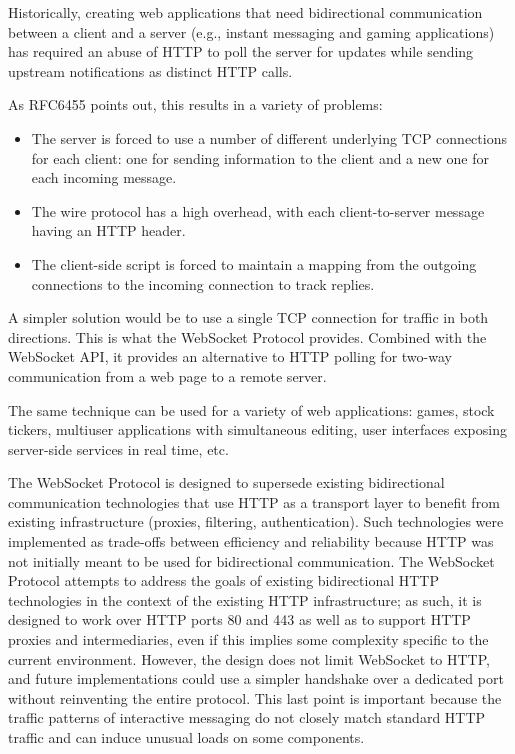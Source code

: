 Historically, creating web applications that need bidirectional communication
between a client and a server (e.g., instant messaging and gaming applications)
has required an abuse of HTTP to poll the server for updates while sending
upstream notifications as distinct HTTP calls.

As RFC6455\cite{websockets} points out, this results in a variety of problems:

\begin{itemize}

\item The server is forced to use a number of different underlying TCP
  connections for each client: one for sending information to the
  client and a new one for each incoming message.

\item The wire protocol has a high overhead, with each client-to-server
  message having an HTTP header.

\item The client-side script is forced to maintain a mapping from the
  outgoing connections to the incoming connection to track replies.

\end{itemize}

A simpler solution would be to use a single TCP connection for traffic in both
directions. This is what the WebSocket Protocol provides. Combined with the
WebSocket API, it provides an alternative to HTTP polling for two-way
communication from a web page to a remote server.

The same technique can be used for a variety of web applications: games, stock
tickers, multiuser applications with simultaneous editing, user interfaces
exposing server-side services in real time, etc.

The WebSocket Protocol is designed to supersede existing bidirectional
communication technologies that use HTTP as a transport layer to benefit from
existing infrastructure (proxies, filtering, authentication). Such technologies
were implemented as trade-offs between efficiency and reliability because HTTP
was not initially meant to be used for bidirectional communication. The
WebSocket Protocol attempts to address the goals of existing bidirectional HTTP
technologies in the context of the existing HTTP infrastructure; as such, it is
designed to work over HTTP ports 80 and 443 as well as to support HTTP proxies
and intermediaries, even if this implies some complexity specific to the current
environment. However, the design does not limit WebSocket to HTTP, and future
implementations could use a simpler handshake over a dedicated port without
reinventing the entire protocol. This last point is important because the
traffic patterns of interactive messaging do not closely match standard HTTP
traffic and can induce unusual loads on some components.


